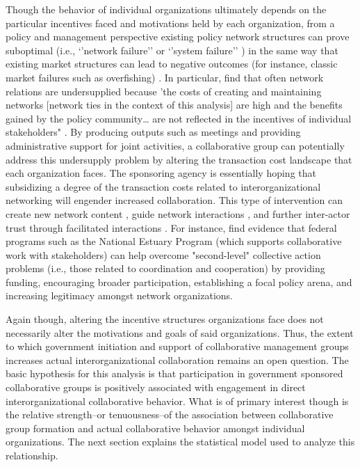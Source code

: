 \documentclass[12pt,a4paper,titlepage]{article}
\begin{document}
Though the behavior of individual organizations ultimately depends on the particular incentives faced and motivations held by each organization, from a policy and management perspective existing policy network structures can prove suboptimal (i.e., `'network failure'' \parencite{schrank2011} or `'system failure'' \parencite{carlsson1997}) in the same way that existing market structures can lead to negative outcomes (for instance, classic market failures such as overfishing) \parencite{weimer2010}. In particular, \textcite{schneider2003} find that often network relations are undersupplied because 'the costs of creating and maintaining networks [network ties in the context of this analysis] are high and the benefits gained by the policy community… are not reflected in the incentives of individual stakeholders" \parencite[144]{schneider2003}. By producing outputs such as meetings and providing administrative support for joint activities, a collaborative group can potentially address this undersupply problem by altering the transaction cost landscape that each organization faces. The sponsoring agency is essentially hoping that subsidizing a degree of the transaction costs related to interorganizational networking will engender increased collaboration. This type of intervention can create new network content \parencite{koppenjan2004}, guide network interactions \parencite{kickert1997,mandell1990}, and further inter-actor trust through facilitated interactions \parencite{klijn2010}. For instance, \textcite{schneider2003} find evidence that federal programs such as the National Estuary Program (which supports collaborative work with stakeholders) can help overcome "second-level" collective action problems (i.e., those related to coordination and cooperation) by providing funding, encouraging broader participation, establishing a focal policy arena, and increasing legitimacy amongst network organizations.

Again though, altering the incentive structures organizations face does not necessarily alter the motivations and goals of said organizations. Thus, the extent to which government initiation and support of collaborative management groups increases actual interorganizational collaboration remains an open question. The basic hypothesis for this analysis is that participation in government sponsored collaborative groups is positively associated with engagement in direct interorganizational collaborative behavior. What is of primary interest though is the relative strength--or tenuousness--of the association between collaborative group formation and actual collaborative behavior amongst individual organizations. The next section explains the statistical model used to analyze this relationship.
\end{document}
